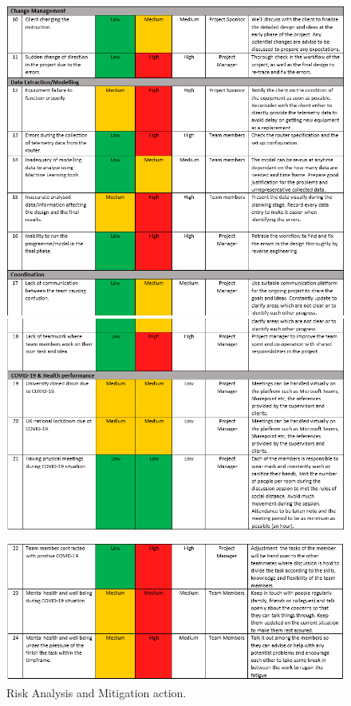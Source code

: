  \begin{figure}[ht]
    \includegraphics[width=1\textwidth]{images/Risk_2.PNG}
    \includegraphics[width=1\textwidth]{images/Risk_3.png}
\end{figure}

 \begin{figure}[t]
    \includegraphics[width=1\textwidth]{images/Risk_4.png}
    \caption{Risk Analysis and Mitigation action.}
    \vspace*{6in}
    \label{fig:risk}
\end{figure}
